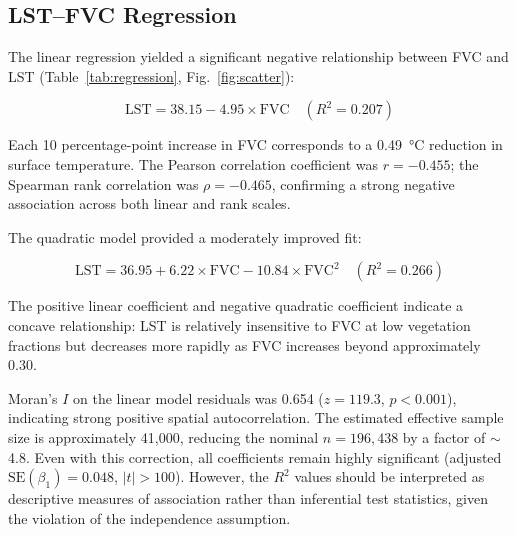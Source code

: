 \documentclass[preprint,12pt]{elsarticle}
\begin{document}
\subsection{LST--FVC Regression}

The linear regression yielded a significant negative relationship between FVC and LST (Table~\ref{tab:regression}, Fig.~\ref{fig:scatter}):

\begin{equation}
    \text{LST} = 38.15 - 4.95 \times \text{FVC} \quad (R^2 = 0.207)
\end{equation}

Each 10 percentage-point increase in FVC corresponds to a \SI{0.49}{\degreeCelsius} reduction in surface temperature. The Pearson correlation coefficient was $r = -0.455$; the Spearman rank correlation was $\rho = -0.465$, confirming a strong negative association across both linear and rank scales.

The quadratic model provided a moderately improved fit:

\begin{equation}
    \text{LST} = 36.95 + 6.22 \times \text{FVC} - 10.84 \times \text{FVC}^2 \quad (R^2 = 0.266)
\end{equation}

\noindent The positive linear coefficient and negative quadratic coefficient indicate a concave relationship: LST is relatively insensitive to FVC at low vegetation fractions but decreases more rapidly as FVC increases beyond approximately 0.30.

Moran's $I$ on the linear model residuals was 0.654 ($z = 119.3$, $p < 0.001$), indicating strong positive spatial autocorrelation. The estimated effective sample size is approximately 41,000, reducing the nominal $n = 196{,}438$ by a factor of $\sim$4.8. Even with this correction, all coefficients remain highly significant (adjusted $\text{SE}(\beta_1) = 0.048$, $|t| > 100$). However, the $R^2$ values should be interpreted as descriptive measures of association rather than inferential test statistics, given the violation of the independence assumption.
\end{document}
